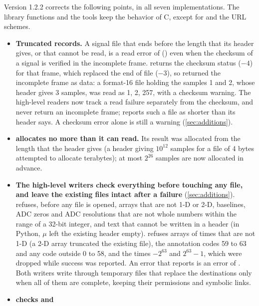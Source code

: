 Version 1.2.2 corrects the following points, in all seven implementations.
The library functions and the tools keep the behavior of C, except for
 and the URL schemes.
\begin{itemize}
\item \textbf{Truncated records.} A signal file that ends before the length
  that its header gives, or that cannot be read, is a read error of
   () even when the checksum of a signal is verified in the
  incomplete frame.  returns the checksum status ($-4$) for that
  frame, which replaced the end of file ($-3$), so 
  returned the incomplete frame as data: a format-16 file holding the
  samples 1 and 2, whose header gives 3 samples, was read as 1, 2, 257, with
  a checksum warning. The high-level readers now track a read failure
  separately from the checksum, and never return an incomplete frame;
   reports such a file as shorter than its header says.
  A checksum error alone is still a warning (\cref{sec:additions}).
\item \textbf{ allocates no more than it can read.} Its
  result was allocated from the length that the header gives (a header
  giving $10^{12}$ samples for a file of 4 bytes attempted to allocate
  terabytes); at most $2^{26}$ samples are now allocated in advance.
\item \textbf{The high-level writers check everything before touching any
  file, and leave the existing files intact after a failure}
  (\cref{sec:additions}).  refuses, before any file is
  opened, arrays that are not 1-D or 2-D, baselines, ADC zeros and ADC
  resolutions that are not whole numbers within the range of a 32-bit
  integer, and text that cannot be written in a header (in Python,
  $\mu$ left the existing header empty).
   refuses arrays of times that are not 1-D (a
  2-D array truncated the existing file), the annotation codes 59 to 63 and
  any code outside 0 to 58, and the times $-2^{63}$ and $2^{63}-1$, which
  were dropped while success was reported. An error that 
  reports is an error of . Both writers write
  through temporary files that replace the destinations only when all of
  them are complete, keeping their permissions and symbolic links.
\item \textbf{ checks  and
}
\end{itemize}
